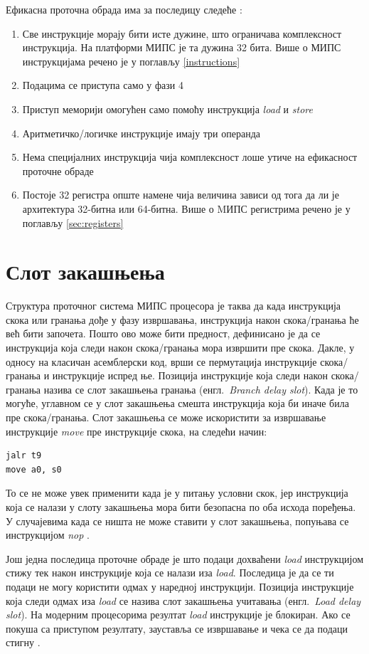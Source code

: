 \documentclass[12pt,oneside]{memoir}
\begin{document}
Ефикасна проточна обрада има за последицу следеће \cite{mips}:
\begin{enumerate}
\item Све инструкције морају бити исте дужине, што ограничава комплексност инструкција. На платформи МИПС је та дужина 32 бита. Више о МИПС инструкцијама речено је у поглављу \ref{instructions}
\item Подацима се приступа само у фази 4
\item Приступ меморији омогућен само помоћу инструкција \textit{load} и \textit{store}
\item Аритметичко/логичке инструкције имају три операнда
\item Нема специјалних инструкција чија комплексност лоше утиче на ефикасност проточне обраде
\item Постоје 32 регистра опште намене чија  величина зависи од тога да ли је архитектура 32-битна или 64-битна. Више о MИПС регистрима речено је у поглављу \ref{sec:registers}
\end{enumerate}

\section{Слот закашњења}
\label{delay-slot}

Структура проточног система МИПС процесора је таква да када инструкција скока или гранања дође у фазу извршавања, инструкција након скока/гранања ће већ бити започета. Пошто ово може бити предност, дефинисано је да се инструкција која следи након скока/гранања мора извршити пре скока. Дакле, у односу на класичан асемблерски код, врши се пермутација инструкције скока/гранања и инструкције испред ње.
Позиција инструкције која следи након скока/гранања назива се слот закашњења гранања (енгл.~\textit{Branch delay slot}). Када је то могуће, углавном се у слот закашњења смешта инструкција која би иначе била пре скока/гранања. Слот закашњења се може искористити за извршавање инструкције \textit{move} пре инструкције скока, на следећи начин:
\begin{verbatim}
jalr t9
move a0, s0
\end{verbatim}
То се не може увек применити када је у питању условни скок, јер инструкција која се налази у слоту закашњења мора бити безопасна по оба исхода поређења. У случајевима када се ништа не може ставити у слот закашњења, попуњава се инструкцијом \textit{nop} \cite{mips}.

Још једна последица проточне обраде је што подаци дохваћени \textit{load} инструкцијом стижу тек након инструкције која се налази иза \textit{load}. Последица је да се ти подаци не могу користити одмах у наредној инструкцији. Позиција инструкције која следи одмах иза \textit{load} се назива слот закашњења учитавања (енгл.~\textit{Load delay slot}). На модерним процесорима резултат \textit{load} инструкције је блокиран. Ако се покуша са приступом резултату, зауставља се извршавање и чека се да подаци стигну \cite{mips}. 
\end{document}

